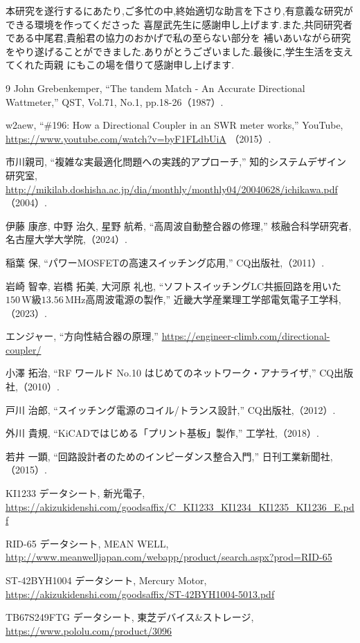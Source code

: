 \documentclass[uplatex, 12pt]{ujbook}
\begin{document}
\acknowledgment
本研究を遂行するにあたり,ご多忙の中,終始適切な助言を下さり,有意義な研究ができる環境を作ってくださった
喜屋武先生に感謝申し上げます.また,共同研究者である中尾君,貴船君の協力のおかげで私の至らない部分を
補いあいながら研究をやり遂げることができました.ありがとうございました.最後に,学生生活を支えてくれた両親
にもこの場を借りて感謝申し上げます.
\begin{thebibliography}{9}
        John Grebenkemper,
       ``The tandem Match - An Accurate Directional Wattmeter,''
       QST, Vol.71, No.1, pp.18-26（1987）.

        w2aew,
       ``\#196: How a Directional Coupler in an SWR meter works,''
       YouTube, \url{https://www.youtube.com/watch?v=byF1FLdbUiA} （2015）.

          市川親司,
       ``複雑な実最適化問題への実践的アプローチ,''
       知的システムデザイン研究室, \url{http://mikilab.doshisha.ac.jp/dia/monthly/monthly04/20040628/ichikawa.pdf} （2004）.

       
        伊藤 康彦, 中野 治久, 星野 航希,
       ``高周波自動整合器の修理,''
       核融合科学研究者,名古屋大学大学院,（2024）.

        稲葉 保,
       ``パワーMOSFETの高速スイッチング応用,''
       CQ出版社,（2011）.

        岩崎 智幸, 岩橋 拓美, 大河原 礼也, 
       ``ソフトスイッチングLC共振回路を用いた$150\, \mathrm{W}$級$13.56\, \mathrm{MHz}$高周波電源の製作,''
       近畿大学産業理工学部電気電子工学科,（2023）.

        エンジャー,
       ``方向性結合器の原理,''
       \url{https://engineer-climb.com/directional-coupler/}

        小澤 拓治,
       ``RF ワールド No.10 はじめてのネットワーク・アナライザ,''
       CQ出版社,（2010）.

        戸川 治郎,
       ``スイッチング電源のコイル/トランス設計,''
       CQ出版社,（2012）.

        外川 貴規,
       ``KiCADではじめる「プリント基板」製作,''
       工学社,（2018）.

        若井 一顕,
       ``回路設計者のためのインピーダンス整合入門,''
       日刊工業新聞社,（2015）.

        KI1233 データシート, 新光電子, 
       \url{https://akizukidenshi.com/goodsaffix/C_KI1233_KI1234_KI1235_KI1236_E.pdf}

        RID-65 データシート, MEAN WELL, 
       \url{http://www.meanwelljapan.com/webapp/product/search.aspx?prod=RID-65}

        ST-42BYH1004 データシート, Mercury Motor, 
       \url{https://akizukidenshi.com/goodsaffix/ST-42BYH1004-5013.pdf}

        TB67S249FTG データシート, 東芝デバイス\&ストレージ, 
       \url{https://www.pololu.com/product/3096}

\end{thebibliography}
\end{document}
